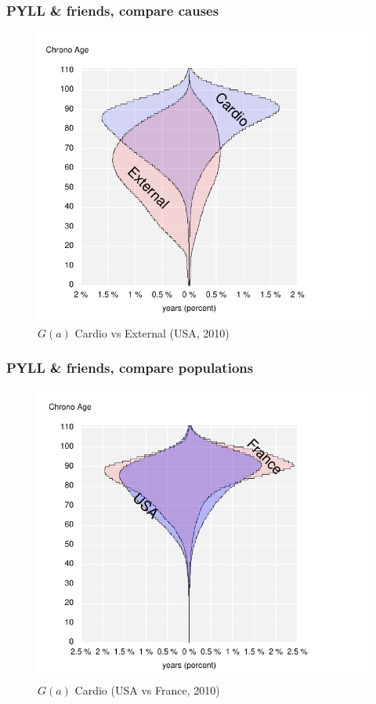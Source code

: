 \documentclass{beamer}
\begin{document}
\begin{frame}
\frametitle{PYLL \& friends, compare causes}
\vspace{-1cm}
\begin{figure}[b]
    \centering
    \includegraphics[scale=.7]{Figures/f11_AgesWoncomp.pdf}
    \caption{$G(a)$ Cardio vs External (USA, 2010)}
\end{figure} 
\end{frame}

\begin{frame}
\frametitle{PYLL \& friends, compare populations}
\vspace{-1cm}
\begin{figure}[b]
    \centering
    \includegraphics[scale=.7]{Figures/f12_AgesWoncountries.pdf}
    \caption{$G(a)$ Cardio (USA vs France, 2010)}
\end{figure} 
\end{frame}
\end{document}
